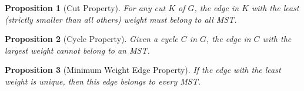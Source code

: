 \documentclass[10pt, letterpaper]{article}
\newtheorem{prop}{Proposition}
\theoremstyle{remark}
\theoremstyle{definition}
\begin{document}
\begin{prop}[Cut Property]
For any cut $K$ of $G$, the edge in $K$ with the least (strictly smaller than all others) weight must belong to all MST.
\end{prop}

\begin{prop}[Cycle Property]
Given a cycle $C$ in $G$, the edge in $C$ with the largest weight cannot belong to an MST.
\end{prop}

\begin{prop}[Minimum Weight Edge Property]
If the edge with the least weight is unique, then this edge belongs to every MST.
\end{prop}
\end{document}
